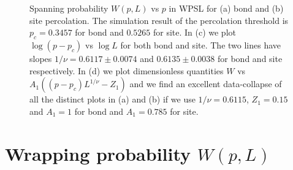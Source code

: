 ﻿\documentclass[twocolumn,showpacs,preprintnumbers,amsmath,amssymb]{revtex4}
\begin{document}
\begin{figure}
\centering
{}



\caption{Spanning probability $W(p,L)$ vs $p$ in WPSL for (a) bond and 
(b) site percolation. The simulation result of the percolation threshold is
$p_{c}=0.3457$ for bond and $0.5265$ for site. In (c) we plot $\log(p-p_c)$ vs $\log L$ for both bond and site. The two lines have slopes $1/\nu=0.6117\pm 0.0074$ and $0.6135 \pm 0.0038$ for bond and site respectively. In (d) we plot dimensionless quantities $W$ vs $A_1((p-p_c)L^{1/\nu}-Z_1)$ and we find an excellent data-collapse of all the distinct plots in (a) and (b) if we use $1/\nu=0.6115$, $Z_1= 0.15$ and $A_1=1$ for bond and $A_1=0.785$ for site.
} 
\label{fig:2abcd}
\end{figure}

\section{Wrapping probability $W(p,L)$}
\end{document}
